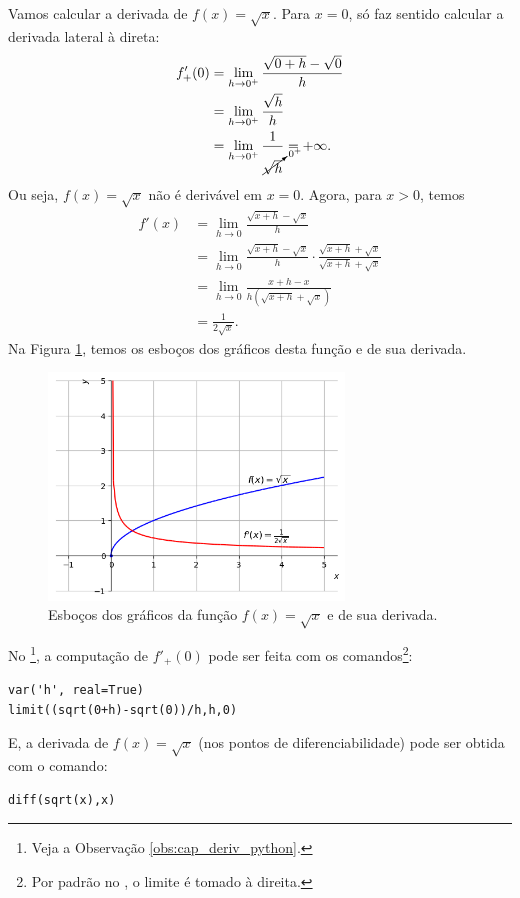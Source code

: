 \begin{ex}
  Vamos calcular a derivada de $f(x) = \sqrt{x}$. Para $x=0$, só faz sentido calcular a derivada lateral à direta:
  \begin{align}
    f'_{+}(0) &= \lim_{h\to 0^+} \frac{\sqrt{0+h}-\sqrt{0}}{h} \\
              &= \lim_{h\to 0^+} \frac{\sqrt{h}}{h} \\
              &= \lim_{h\to 0^+} \frac{1}{\cancelto{0^+}{\sqrt{h}}} = +\infty.
  \end{align}
  Ou seja, $f(x) = \sqrt{x}$ não é derivável em $x=0$. Agora, para $x> 0$, temos
  \begin{align}
    f'(x) &= \lim_{h\to 0} \frac{\sqrt{x+h}-\sqrt{x}}{h}\\
          &= \lim_{h\to 0} \frac{\sqrt{x+h}-\sqrt{x}}{h}\cdot \frac{\sqrt{x+h}+\sqrt{x}}{\sqrt{x+h}+\sqrt{x}}\\
          &= \lim_{h\to 0} \frac{x+h-x}{h(\sqrt{x+h}+\sqrt{x})}\\
          &= \frac{1}{2\sqrt{x}}.
  \end{align}
  Na Figura \ref{fig:deriv_ex_ffl_sqrtx}, temos os esboços dos gráficos desta função e de sua derivada.

  \begin{figure}[H]
    \centering
    \includegraphics[width=0.7\textwidth]{./cap_deriv/dados/fig_deriv_ex_ffl_sqrtx/fig_deriv_ex_ffl_sqrtx}
    \caption{Esboços dos gráficos da função $f(x)=\sqrt{x}$ e de sua derivada.}
    \label{fig:deriv_ex_ffl_sqrtx}
  \end{figure}

  \ifispython
  No \sympy\footnote{Veja a Observação \ref{obs:cap_deriv_python}.}, a computação de $f'_{+}(0)$ pode ser feita com os comandos\footnote{Por padrão no \sympy, o limite é tomado à direita.}:
\begin{verbatim}
var('h', real=True)
limit((sqrt(0+h)-sqrt(0))/h,h,0)
\end{verbatim}
  E, a derivada de $f(x) = \sqrt{x}$ (nos pontos de diferenciabilidade) pode ser obtida com o comando:
\begin{verbatim}
diff(sqrt(x),x)
\end{verbatim}
  \fi
\end{ex}

